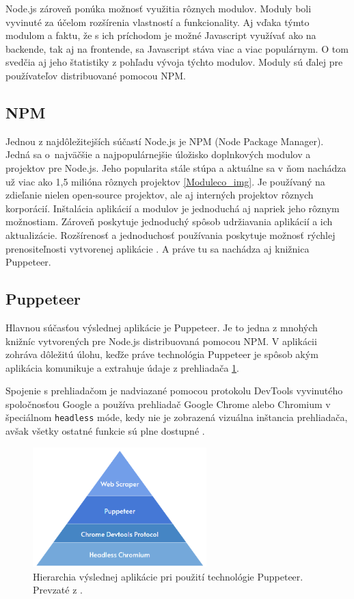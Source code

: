 \bigskip

Node.js zároveň ponúka možnosť využitia rôznych modulov. Moduly boli vyvinuté za účelom rozšírenia vlastností a funkcionality. Aj vďaka týmto modulom a faktu, že s ich príchodom je možné Javascript využívať ako na backende, tak aj na frontende, sa Javascript stáva viac a viac populárnym. O tom svedčia aj jeho štatistiky z pohľadu vývoja týchto modulov. Moduly sú ďalej pre používateľov distribuované pomocou NPM.

\subsection{NPM}

Jednou z najdôležitejších súčastí Node.js je NPM (Node Package Manager). Jedná sa o~najväčšie a najpopulárnejšie úložisko doplnkových modulov a projektov pre Node.js. Jeho popularita stále stúpa a aktuálne sa v ňom nachádza už viac ako 1,5 milióna rôznych projektov \ref{Moduleco_img}. Je používaný na zdieľanie nielen open-source projektov, ale aj interných projektov rôznych korporácií. Inštalácia aplikácií a modulov je jednoduchá aj napriek jeho rôznym možnostiam. Zároveň poskytuje jednoduchý spôsob udržiavania aplikácií a ich aktualizácie. Rozšírenosť a jednoduchosť používania poskytuje možnosť rýchlej prenositeľnosti vytvorenej aplikácie \cite{npm}. A práve tu sa nachádza aj knižnica Puppeteer.

\newpage
\subsection{Puppeteer}

Hlavnou súčasťou výslednej aplikácie je Puppeteer. Je to jedna z mnohých knižníc vytvorených pre Node.js distribuovaná pomocou NPM. V aplikácii zohráva dôležitú úlohu, keďže práve technológia Puppeteer je spôsob akým aplikácia komunikuje a extrahuje údaje z prehliadača \ref{pupepyramid_img}. 

Spojenie s prehliadačom je nadviazané pomocou protokolu DevTools vyvinutého spoločnosťou Google a používa prehliadač Google Chrome alebo Chromium v špeciálnom \texttt{headless} móde, kedy nie je zobrazená vizuálna inštancia prehliadača, avšak všetky ostatné funkcie sú plne dostupné \cite{puppeteer}.  

\bigskip

\begin{figure}[hbt]
	\centering
	\includegraphics[width=0.6\textwidth]{obrazky-figures/pyramid.png}
	\caption{Hierarchia výslednej aplikácie pri použití technológie Puppeteer. Prevzaté z \cite{pyramid}.}
	\label{pupepyramid_img}
\end{figure}


